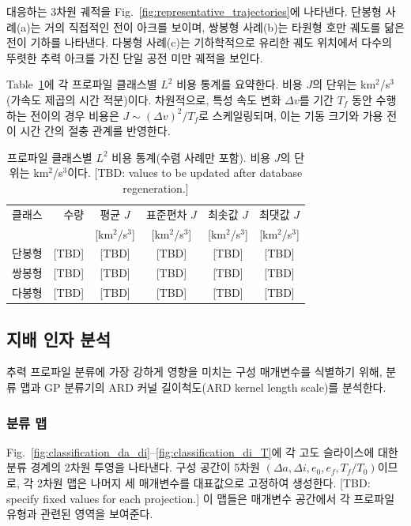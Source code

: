 \documentclass[a4paper,fleqn]{cas-dc}
\let\origsubsection\subsection
\renewcommand{\subsection}{\FloatBarrier\origsubsection}
\begin{document}
대응하는 3차원 궤적을 Fig.~\ref{fig:representative_trajectories}에 나타낸다. 단봉형 사례(a)는 거의 직접적인 전이 아크를 보이며, 쌍봉형 사례(b)는 타원형 호만 궤도를 닮은 전이 기하를 나타낸다. 다봉형 사례(c)는 기하학적으로 유리한 궤도 위치에서 다수의 뚜렷한 추력 아크를 가진 단일 공전 미만 궤적을 보인다.

Table~\ref{tab:class_cost}에 각 프로파일 클래스별 $L^2$ 비용 통계를 요약한다. 비용 $J$의 단위는 km$^2$/s$^3$(가속도 제곱의 시간 적분)이다. 차원적으로, 특성 속도 변화 $\Delta v$를 기간 $T_f$ 동안 수행하는 전이의 경우 비용은 $J \sim (\Delta v)^2 / T_f$로 스케일링되며, 이는 기동 크기와 가용 전이 시간 간의 절충 관계를 반영한다.

\begin{table}[ht]
\centering
\caption{프로파일 클래스별 $L^2$ 비용 통계(수렴 사례만 포함). 비용 $J$의 단위는 km$^2$/s$^3$이다. [TBD: values to be updated after database regeneration.]}
\label{tab:class_cost}
\begin{tabular}{lrcccc}
\hline
클래스 & 수량 & 평균 $J$ & 표준편차 $J$ & 최솟값 $J$ & 최댓값 $J$ \\
 & & [km$^2$/s$^3$] & [km$^2$/s$^3$] & [km$^2$/s$^3$] & [km$^2$/s$^3$] \\
\hline
단봉형 & [TBD] & [TBD] & [TBD] & [TBD] & [TBD] \\
쌍봉형 & [TBD] & [TBD] & [TBD] & [TBD] & [TBD] \\
다봉형 & [TBD] & [TBD] & [TBD] & [TBD] & [TBD] \\
\hline
\end{tabular}
\end{table}

\subsection{지배 인자 분석}\label{subsec:dominant_factors}

추력 프로파일 분류에 가장 강하게 영향을 미치는 구성 매개변수를 식별하기 위해, 분류 맵과 GP 분류기의 ARD 커널 길이척도(ARD kernel length scale)를 분석한다.

\subsubsection{분류 맵}

Fig.~\ref{fig:classification_da_di}--\ref{fig:classification_di_T}에 각 고도 슬라이스에 대한 분류 경계의 2차원 투영을 나타낸다. 구성 공간이 5차원 $(\Delta a, \Delta i, e_0, e_f, T_f/T_0)$이므로, 각 2차원 맵은 나머지 세 매개변수를 대표값으로 고정하여 생성한다. [TBD: specify fixed values for each projection.] 이 맵들은 매개변수 공간에서 각 프로파일 유형과 관련된 영역을 보여준다.
\end{document}
